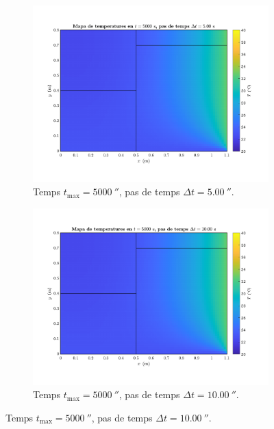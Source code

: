 \begin{figure}[ht]
\begin{subfigure}{.5\textwidth}
	\end{subfigure}
	\begin{subfigure}{.5\textwidth}
		\centering
		\includegraphics[width=.95\linewidth]{imagenes/04_influencia/pas_temps/pas_temps_9.pdf}
		\vspace{-15pt}
		\caption{Temps $t_\text{max} = 5000 \ \second$, pas de temps $\Delta t = 5.00 \ \second$.}
		\label{fig:pas_temps_9}
	\end{subfigure}%
	\begin{subfigure}{.5\textwidth}
		\centering
		\includegraphics[width=.95\linewidth]{imagenes/04_influencia/pas_temps/pas_temps_10.pdf}
		\vspace{-15pt}
		\caption{Temps $t_\text{max} = 5000 \ \second$, pas de temps $\Delta t = 10.00 \ \second$.}
		\label{fig:pas_temps_10}
	\end{subfigure}

\end{figure}
